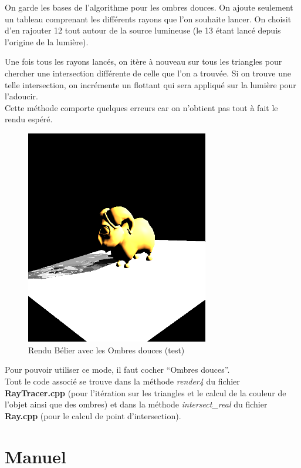 \documentclass[a4paper,11pt,titlepage]{article}
\begin{document}
On garde les bases de l'algorithme pour les ombres douces. On ajoute seulement un tableau comprenant les différents rayons que l'on souhaite lancer. On choisit d'en rajouter 12 tout autour de la source lumineuse (le 13 étant lancé depuis l'origine de la lumière). 

Une fois tous les rayons lancés, on itère à nouveau sur tous les triangles pour chercher une intersection différente de celle que l'on a trouvée. Si on trouve une telle intersection, on incrémente un flottant qui sera appliqué sur la lumière pour l'adoucir.\\

Cette méthode comporte quelques erreurs car on n'obtient pas tout à fait le rendu espéré.

\begin{figure}[H]
 \begin{center}
 \includegraphics[bb=0 0 50 50,width=8cm]{Rendu/OmbresD2.png}
 \end{center}

 \caption{Rendu Bélier avec les Ombres douces (test)}
 \label{rendu4}
\end{figure}

Pour pouvoir utiliser ce mode, il faut cocher ``Ombres douces''.\\

Tout le code associé se trouve dans la méthode \textit{render4} du fichier \textbf{RayTracer.cpp} (pour l'itération sur les triangles et le calcul de la couleur de l'objet ainsi que des ombres) et dans la méthode \textit{intersect\_real} du fichier \textbf{Ray.cpp} (pour le calcul de point d'intersection).


\section{Manuel}
\end{document}
